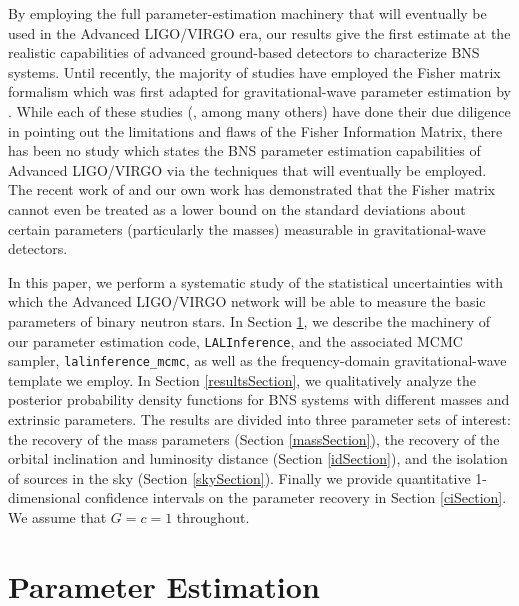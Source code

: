 \documentclass[11pt,a4paper]{emulateapj}
\begin{document}
By employing the full parameter-estimation machinery that will eventually be
used in the Advanced LIGO/VIRGO era, our results give the first estimate at the 
realistic capabilities of advanced ground-based detectors to characterize BNS systems.
  Until recently, the majority of studies have employed the Fisher matrix formalism which was 
first adapted for gravitational-wave parameter estimation by \citep{FinnDetection}.
While each of these studies (\cite{PoissonWill,CutlerFlanagan,ArunPE}, among 
many others) have done their due diligence in pointing out the limitations 
and flaws of the Fisher Information Matrix, there has been no study which states
the BNS parameter estimation capabilities of Advanced LIGO/VIRGO via the techniques
that will eventually be employed.  The recent work of \cite{Vallisneri} and our 
own work \citep{Inadequacies} has demonstrated that the Fisher matrix cannot even
be treated as a lower bound on the standard deviations about certain parameters
(particularly the masses) measurable in gravitational-wave detectors.

In this paper, we perform a systematic study of the statistical uncertainties with
which the Advanced LIGO/VIRGO network will be able to measure the basic parameters of 
binary neutron stars.  In Section \ref{PEsection}, we describe
the machinery of our parameter estimation code, \texttt{LALInference}, and the associated
MCMC sampler, \texttt{lalinference\_mcmc}, as well as the frequency-domain gravitational-wave template we employ.   
In Section \ref{resultsSection}, we qualitatively analyze the posterior probability density functions for BNS systems with different masses and extrinsic parameters.  The results are divided into three parameter sets of interest: the recovery of the mass parameters (Section \ref{massSection}), the recovery of the orbital inclination and luminosity distance (Section \ref{idSection}), and the isolation of sources in the sky (Section \ref{skySection}).   Finally we provide quantitative 1-dimensional confidence intervals on the parameter recovery in Section \ref{ciSection}.  We assume that $G=c=1$ throughout.

 

\section{Parameter Estimation}
\label{PEsection}
\end{document}
